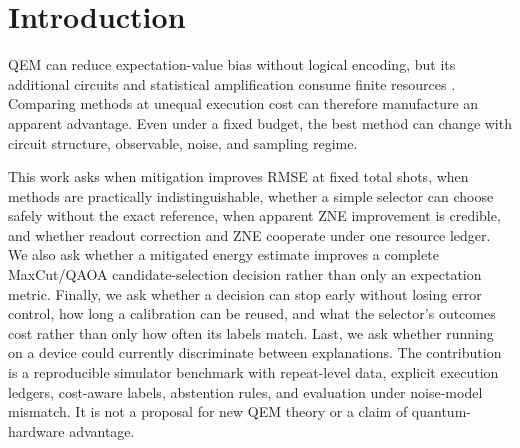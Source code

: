 \documentclass[10pt,twocolumn]{article}
\begin{document}
\begin{abstract}
Sequential stopping with corrected repeated looks saves shots on clear decisions while
keeping false certification below 3\% at zero margin, compared with 22--25\% for
uncorrected peeking. It cannot detect bias: under strong gate-noise imbalance, raw
estimation certifies the wrong candidate in every repeat after about 2,000 shots.
Under synthetic readout drift, triggered recalibration uses about
\TriggerShotSaving{} fewer shots than recalibrating at every decision with similar
reliability, whereas indefinite reuse fails under directed drift.
A hardware readiness review of six candidate cells ends in a documented no-go, with
no job submitted: only \HardwareGoMet{} of \HardwareGoTotal{} go requirements is met.
These simulated results support selective mitigation and abstention as research
questions, but do not validate a general selector or establish hardware performance.
\end{abstract}

\section{Introduction}
QEM can reduce expectation-value bias without logical encoding, but its additional
circuits and statistical amplification consume finite resources
\cite{temme2017,li2017,cai2023}. Comparing methods at unequal execution cost can
therefore manufacture an apparent advantage. Even under a fixed budget, the best
method can change with circuit structure, observable, noise, and sampling regime.

This work asks when mitigation improves RMSE at fixed total shots, when methods are
practically indistinguishable, whether a simple selector can choose safely without
the exact reference, when apparent ZNE improvement is credible, and whether readout
correction and ZNE cooperate under one resource ledger. We also ask whether a
mitigated energy estimate improves a complete MaxCut/QAOA candidate-selection
decision rather than only an expectation metric. Finally, we ask whether a decision
can stop early without losing error control, how long a calibration can be reused,
and what the selector's outcomes cost rather than only how often its labels match.
Last, we ask whether running on a device could currently discriminate between explanations.
The contribution is a
reproducible simulator benchmark with repeat-level data, explicit execution ledgers,
cost-aware labels, abstention rules, and evaluation under noise-model mismatch. It is
not a proposal for new QEM theory or a claim of quantum-hardware advantage.
\end{document}
